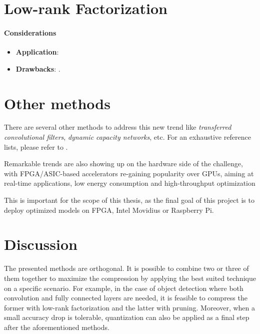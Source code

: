 \section{Low-rank Factorization}



\paragraph{Considerations}
\begin{itemize}
    \item \textbf{Application}: 
    
    \item \textbf{Drawbacks}: . 
\end{itemize}

\section{Other methods}
There are several other methods to address this new trend like \emph{transferred convolutional filters}, \emph{dynamic capacity networks}, etc. For an exhaustive reference lists, please refer to \parencite{survey2017}. 

Remarkable trends are also showing up on the hardware side of the challenge, with FPGA/ASIC-based accelerators re-gaining popularity over GPUs, aiming at real-time applications, low energy consumption and high-throughput optimization 

This is important for the scope of this thesis, as the final goal of this project is to deploy optimized models on FPGA, Intel Movidius or Raspberry Pi. 

\section{Discussion}
The presented methods are orthogonal. It is possible to combine two or three of them together to maximize the compression by applying the best suited technique on a specific scenario. For example, in the case of object detection where both convolution and fully connected layers are needed, it is feasible to compress the former with low-rank factorization and the latter with pruning. 
Moreover, when a small accuracy drop is tolerable, quantization can also be applied as a final step after the aforementioned methods. 

